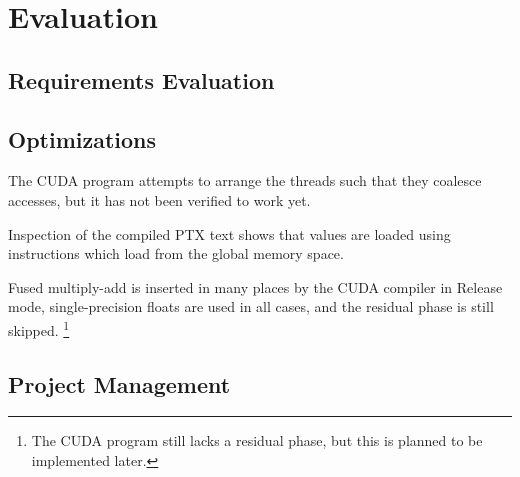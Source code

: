 
\chapter{Evaluation}

\section{Requirements Evaluation}





\section{Optimizations}
The CUDA program attempts to arrange the threads such that they coalesce accesses, but it has not been verified to work yet.

Inspection of the compiled PTX text shows that values are loaded using  instructions which load from the global memory space.

Fused multiply-add is inserted in many places by the CUDA compiler in Release mode, single-precision floats are used in all cases, and the residual phase is still skipped.
\footnote{The CUDA program still lacks a residual phase, but this is planned to be implemented later.\label{sec:OptimizationReAddingResidual}}


\section{Project Management}



